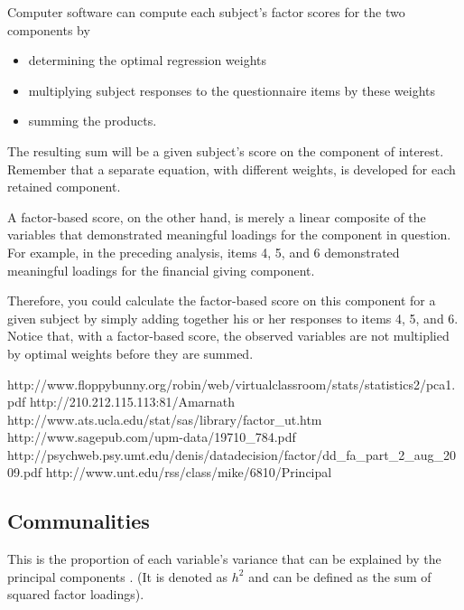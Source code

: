 Computer software can compute each subject’s factor scores for the two components
by

\begin{itemize}
\item determining the optimal regression weights
\item multiplying subject responses to the questionnaire items by these weights
\item summing the products.
\end{itemize}

The resulting sum will be a given subject’s score on the component of interest. Remember that a
separate equation, with different weights, is developed for each retained component.

A factor-based score, on the other hand, is merely a linear composite of the variables that
demonstrated meaningful loadings for the component in question. For example, in the preceding
analysis, items 4, 5, and 6 demonstrated meaningful loadings for the financial giving component.

Therefore, you could calculate the factor-based score on this component for a given subject by
simply adding together his or her responses to items 4, 5, and 6. Notice that, with a factor-based
score, the observed variables are not multiplied by optimal weights before they are summed.




http://www.floppybunny.org/robin/web/virtualclassroom/stats/statistics2/pca1.pdf
http://210.212.115.113:81/Amarnath%
http://www.ats.ucla.edu/stat/sas/library/factor_ut.htm
http://www.sagepub.com/upm-data/19710_784.pdf
http://psychweb.psy.umt.edu/denis/datadecision/factor/dd_fa_part_2_aug_2009.pdf
http://www.unt.edu/rss/class/mike/6810/Principal%
\subsection{Communalities}

This is the proportion of each variable's variance that can be explained by the principal components .  (It is denoted as $h^2$ and can be defined as the sum of squared factor loadings).

